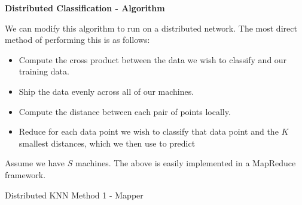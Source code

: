 \vspace{5 mm}
\noindent
\textbf{Distributed Classification - Algorithm}

\vspace{5 mm}
\noindent
We can modify this algorithm to run on a distributed network. The most direct 
method of performing this is as follows:

\begin{itemize}
\item Compute the cross product between the data we wish to classify and our 
training data.
\item Ship the data evenly across all of our machines.
\item Compute the distance between each pair of points locally.
\item Reduce for each data point we wish to classify that data point and the 
$K$ smallest distances, which we then use to predict
\end{itemize}

\vspace{5 mm}
\noindent
Assume we have $S$ machines. The above is easily implemented in a MapReduce 
framework.

\begin{algorithm}
\DontPrintSemicolon
{}
\caption{Distributed KNN Method 1 - Mapper\label{KNN1m}}
\end{algorithm}

